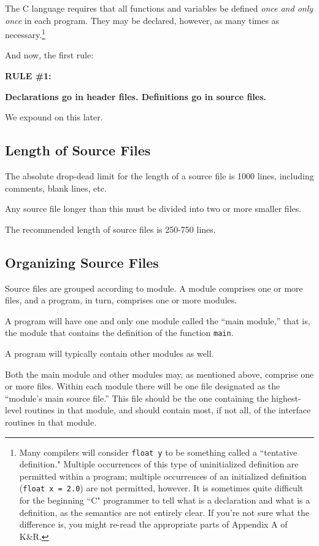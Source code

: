 The C language requires that all functions and variables be defined
{\em once and only once} in each program.  They may be declared,
however, as many times as necessary.\footnote {Many compilers will
consider {\tt float y} to be something called a ``tentative
definition."  Multiple occurrences of this type of uninitialized
definition are permitted within a program; multiple occurrences of an
initialized definition ({\tt float x = 2.0}) are not permitted,
however.  It is sometimes quite difficult for the beginning ``C"
programmer to tell what is a declaration and what is a definition, as
the semantics are not entirely clear.  If you're not sure what the
difference is, you might re-read the appropriate parts of Appendix A
of K\&R.}

And now, the first rule:\vspace{.25 in}

{\bf RULE \#1:}

{\bf Declarations go in header files.  Definitions go in source
files.}\vspace{ .25 in}

We expound on this later.

\subsection{Length of Source Files}
The absolute drop-dead limit for the length of a source file is 1000
lines, including comments, blank lines, etc.

Any source file longer than this must be divided into two or more
smaller files.

The recommended length of source files is 250-750 lines.


\subsection{Organizing Source Files}
Source files are grouped according to module.  A module comprises one
or more files, and a program, in turn, comprises one or more modules.

A program will have one and only one module called the ``main
module,'' that is, the module that contains the definition of the
function {\tt main}.

A program will typically contain other modules as well.

Both the main module and other modules may, as mentioned above,
comprise one or more files.  Within each module there will be one file
designated as the ``module's main source file.''  This file should be
the one containing the highest-level routines in that module, and
should contain most, if not all, of the interface routines in that
module.

